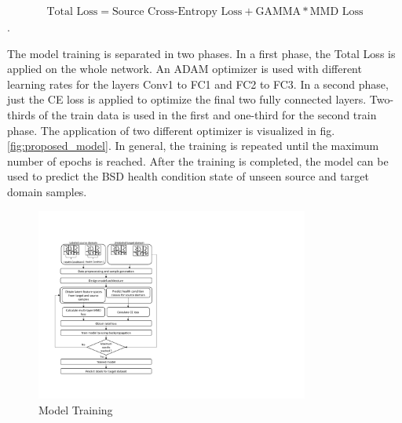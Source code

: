 \begin{align}
    \mbox{Total Loss} = \mbox{Source Cross-Entropy Loss} + \mbox{GAMMA} * \mbox{MMD Loss}
\end{align}.

The model training is separated in two phases. In a first phase, the Total Loss is applied on the whole network. An ADAM optimizer is used with different learning rates for the layers Conv1 to FC1 and FC2 to FC3. In a second phase, just the CE loss is applied to optimize the final two fully connected layers. Two-thirds of the train data is used in the first and one-third for the second train phase. The application of two different optimizer is visualized in fig. \ref{fig:proposed_model}. In general, the training is repeated until the maximum number of epochs is reached. After the training is completed, the model can be used to predict the BSD health condition state of unseen source and target domain samples. 

\begin{figure}[H]
  \centering
  \includegraphics[width=0.8\textwidth]{training_process_mmd.pdf}
  \caption {Model Training} \label{fig:Training_Process_MMD}
\end{figure}


